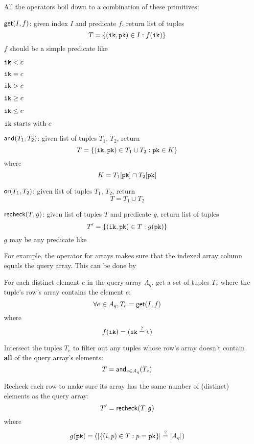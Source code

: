 \documentclass[11pt]{article}
\begin{document}
All the operators boil down to a combination of these primitives:

\begin{oparts}
\item
  $\mathsf{get}(I, f)$:
  given index $I$ and predicate $f$, return list of tuples
  \[
    T = \lbrace(\mathtt{ik}, \mathtt{pk}) \in I : f(\mathtt{ik})\rbrace
  \]
  $f$ should be a simple predicate like
  \begin{oparts}
  \item
    $\mathtt{ik} < c$
  \item
    $\mathtt{ik} = c$
  \item
    $\mathtt{ik} > c$
  \item
    $\mathtt{ik} \geq c$
  \item
    $\mathtt{ik} \leq c$
  \item
    $\mathtt{ik}~\textnormal{starts with}~c$
  \end{oparts}
\item
  $\mathsf{and}(T_1, T_2)$:
  given list of tuples $T_1$, $T_2$, return
  \[
    T = \lbrace(\mathtt{ik}, \mathtt{pk}) \in T_1 \cup T_2 : \mathtt{pk} \in K\rbrace
  \]
  where
  \[
    K = T_1[\mathtt{pk}] \cap T_2[\mathtt{pk}]
  \]
\item
  $\mathsf{or}(T_1, T_2)$:
  given list of tuples $T_1$, $T_2$, return
  \[
    T = T_1 \cup T_2
  \]
\item
  $\mathsf{recheck}(T, g)$:
  given list of tuples $T$ and predicate $g$, return list of tuples
  \[
    T' = \lbrace(\mathtt{ik}, \mathtt{pk}) \in T : g(\mathtt{pk})\rbrace
  \]
  $g$ may be any predicate like
  \begin{oparts}
  \item
  \item
  \end{oparts}
\end{oparts}

For example, the \sqlinline{=} operator for arrays makes sure that the indexed
array column equals the query array. This can be done by

\begin{nparts}
\item
  For each distinct element $e$ in the query array $A_q$, get a set of tuples
  $T_e$ where the tuple's row's array contains the element $e$:
  \[
    \forall e \in A_q, T_e = \mathsf{get}(I, f)
  \]
  where
  \[
    f(\mathtt{ik}) = \lparen\mathtt{ik} \overset{?}{=} e\rparen
  \]
\item
  Intersect the tuples $T_e$ to filter out any tuples whose row's array doesn't
  contain \textbf{all} of the query array's elements:
  \[
    T = \mathsf{and}_{e \in A_q}(T_e)
  \]
\item
  Recheck each row to make sure its array has the same number of (distinct)
  elements as the query array:
  \[
    T' = \mathsf{recheck}(T, g)
  \]
  where
  \[
    g(\mathtt{pk}) = \lparen\lvert\lbrace(i, p) \in T : p = \mathtt{pk}\rbrace\rvert \overset{?}{=}
    \lvert A_q\rvert\rparen
  \]
\end{nparts}
\end{document}
